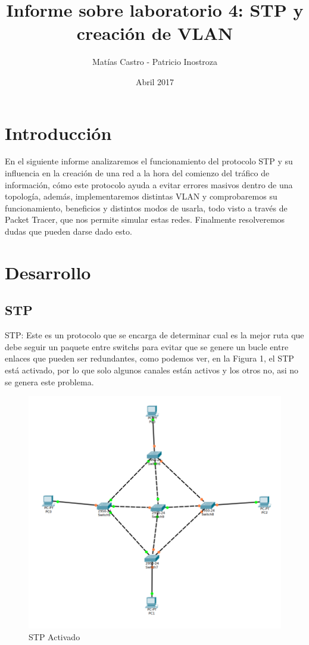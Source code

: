 \documentclass{article}
\title{Informe sobre laboratorio 4: STP y creación de VLAN}
\author{Matías Castro - Patricio Inostroza}
\date{Abril 2017}
\begin{document}
\begin{titlepage}

\maketitle
\huge


\end{titlepage}

\tableofcontents 
\cleardoublepage

\section{Introducción}
En el siguiente informe analizaremos el funcionamiento del protocolo STP y su influencia en la creación de una red a la hora del comienzo del tráfico de información, cómo este protocolo ayuda a evitar errores masivos dentro de una topología, además, implementaremos distintas VLAN y comprobaremos su funcionamiento, beneficios y distintos modos de usarla, todo visto a través de Packet Tracer, que nos permite simular estas redes. Finalmente resolveremos dudas que pueden darse dado esto.

\newpage

\section{Desarrollo}
\subsection{STP}
STP: Este es un protocolo que se encarga de determinar cual es la mejor ruta que debe seguir un paquete entre switchs para evitar que se genere un bucle entre enlaces que pueden ser redundantes, como podemos ver, en la Figura 1, el STP está activado, por lo que solo algunos canales están activos y los otros no, asi no se genera este problema.


\begin{figure}[h]
\centering
\includegraphics[scale=0.4]{STPa}
\caption{STP Activado}
\end{figure}
\end{document}
